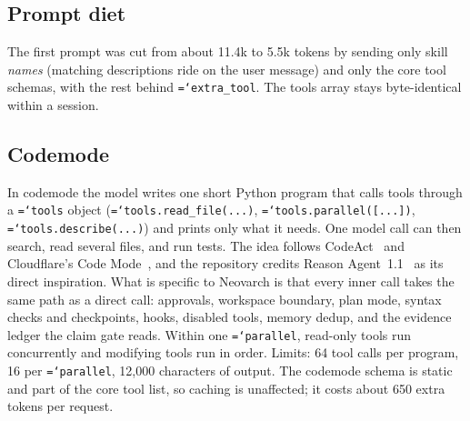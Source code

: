 \documentclass[11pt]{article}
\newcommand{\code}[1]{\texttt{\hyphenchar\font=`\-\relax #1}}
\begin{document}
\subsection{Prompt diet}
The first prompt was cut from about 11.4k to 5.5k tokens by sending only skill \emph{names} (matching descriptions ride on the user message) and only the core tool schemas, with the
rest behind \code{extra\_tool}. The tools array stays byte-identical within a session.

\subsection{Codemode}
\label{sec:codemode}
In codemode the model writes one short Python program that calls tools through a \code{tools} object (\code{tools.read\_file(...)}, \code{tools.parallel([...])},
\code{tools.describe(...)}) and prints only what it needs. One model call can then search, read several files, and run tests. The idea follows CodeAct~\citep{wang2024codeact}
and Cloudflare's Code Mode~\citep{varda2025codemode}, and the repository credits Reason Agent~1.1~\citep{reasonagent11} as its direct inspiration. What is specific to Neovarch is that every inner call takes the
same path as a direct call: approvals, workspace boundary, plan mode, syntax checks and checkpoints, hooks, disabled tools, memory dedup, and the evidence ledger the claim gate reads.
Within one \code{parallel}, read-only tools run concurrently and modifying tools run in order. Limits: 64 tool calls per program, 16 per \code{parallel}, 12,000 characters of output.
The codemode schema is static and part of the core tool list, so caching is unaffected; it costs about 650 extra tokens per request.
\end{document}
